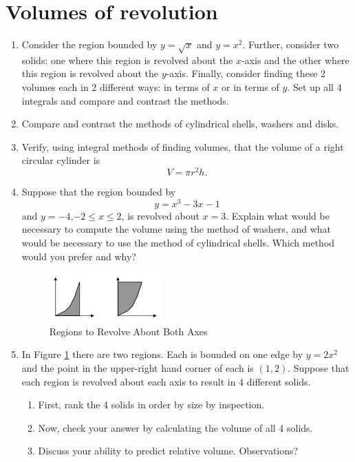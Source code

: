 \begin{enumerate}
 
 \end{enumerate}\section{Volumes of revolution}\begin{enumerate}

\item  Consider the region bounded by $y=\sqrt{x}$ and $y=x^2$.  Further, consider two solids:  one where this region is revolved about the $x$-axis and the other where this region is revolved about the $y$-axis.  Finally, consider finding these 2 volumes each in 2 different ways:  in terms of $x$ or in terms of $y$.  Set up all 4 integrals and compare and contrast the methods.

\item Compare and contrast the methods of cylindrical shells, washers and disks.

\item  Verify, using integral methods of finding volumes, that the volume of a right circular cylinder is $$V = \pi r^2 h.$$  

\item  Suppose that the region bounded by $$y = x^3  - 3x - 1$$ and $y = -4$,$-2 \le  x \le  2$, is revolved about $x = 3$.  Explain what would be necessary to compute the volume using the method of washers, and what would be necessary to use the method of cylindrical shells.  Which method would you prefer and why?

\begin{figure}[ht]
	\centering
		\includegraphics{TeXGraphics/VolRevCom.jpg}
	\caption{Regions to Revolve About Both Axes}
	\label{fig:volrev}
\end{figure}


\item In Figure \ref{fig:volrev} there are two regions.  Each is bounded on one edge by $y=2x^2$ and the point in the upper-right hand corner of each is $(1, 2)$.  Suppose that each region is revolved about each axis to result in 4 different solids.
\begin{enumerate}
\item First, rank the 4 solids in order by size by inspection.
\item Now, check your answer by calculating the volume of all 4 solids.
\item Discuss your ability to predict relative volume.  Observations?
\end{enumerate}



\end{enumerate}
